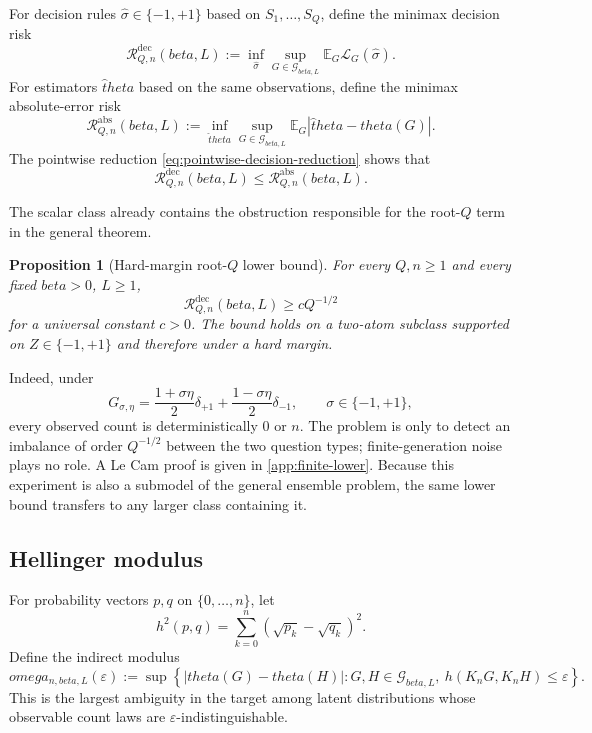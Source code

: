 \documentclass[11pt]{article}
\def\beta{beta}%
\def\theta{theta}%
\def\omega{omega}%
\newtheorem{proposition}[theorem]{Proposition}
\newcommand{\E}{\mathbb E}
\newcommand{\calG}{\mathcal G}
\newcommand{\calR}{\mathcal R}
\newcommand{\eps}{\varepsilon}
\newcommand\ced[1]{{\color{teal!70!black} #1}}
\begin{document}
For decision rules $\widehat\sigma\in\{-1,+1\}$ based on $S_1,\dots,S_Q$, define the minimax decision risk
\begin{equation}
\label{eq:minimax-decision}
\calR^{\mathrm{dec}}_{Q,n}(\beta,L)
:=
\inf_{\widehat\sigma}
\sup_{G\in\calG_{\beta,L}}
\E_G\mathcal L_G(\widehat\sigma).
\end{equation}
For estimators $\widehat\theta$ based on the same observations, define the minimax absolute-error risk
\[
\calR^{\mathrm{abs}}_{Q,n}(\beta,L)
:=
\inf_{\widehat\theta}
\sup_{G\in\calG_{\beta,L}}
\E_G|\widehat\theta-\theta(G)|.
\]
\ced{The pointwise reduction \eqref{eq:pointwise-decision-reduction} shows that}
\begin{equation}
\label{eq:dec-le-abs}
\calR^{\mathrm{dec}}_{Q,n}(\beta,L)
\le
\calR^{\mathrm{abs}}_{Q,n}(\beta,L).
\end{equation}

The scalar class already contains the obstruction responsible for the root-$Q$ term in the general theorem.

\begin{proposition}[Hard-margin root-$Q$ lower bound]
\label{thm:rootQ-scalar}
For every $Q,n\ge1$ and every fixed $\beta>0$, $L\ge1$,
\begin{equation}
\label{eq:rootQ-scalar}
\calR^{\mathrm{dec}}_{Q,n}(\beta,L)
\ge cQ^{-1/2}
\end{equation}
for a universal constant $c>0$.  The bound holds on a two-atom subclass supported on $Z\in\{-1,+1\}$ and therefore under a hard margin.
\end{proposition}

Indeed, under
\[
G_{\sigma,\eta}
=
\frac{1+\sigma\eta}{2}\delta_{+1}
+
\frac{1-\sigma\eta}{2}\delta_{-1},
\qquad \sigma\in\{-1,+1\},
\]
every observed count is deterministically $0$ or $n$.  The problem is only to detect an imbalance of order $Q^{-1/2}$ between the two question types; finite-generation noise plays no role.  A Le Cam proof is given in \cref{app:finite-lower}.  Because this experiment is also a submodel of the general ensemble problem, the same lower bound transfers to any larger class containing it.

\subsection{Hellinger modulus}

For probability vectors $p,q$ on $\{0,\dots,n\}$, let
\[
h^2(p,q)
=
\sum_{k=0}^n(\sqrt{p_k}-\sqrt{q_k})^2.
\]
Define the indirect modulus
\begin{equation}
\label{eq:modulus}
\omega_{n,\beta,L}(\eps)
:=
\sup\left\{
|\theta(G)-\theta(H)|:
G,H\in\calG_{\beta,L},
\ h(K_nG,K_nH)\le\eps
\right\}.
\end{equation}
This is the largest ambiguity in the target among latent distributions whose observable count laws are $\eps$-indistinguishable.
\end{document}
